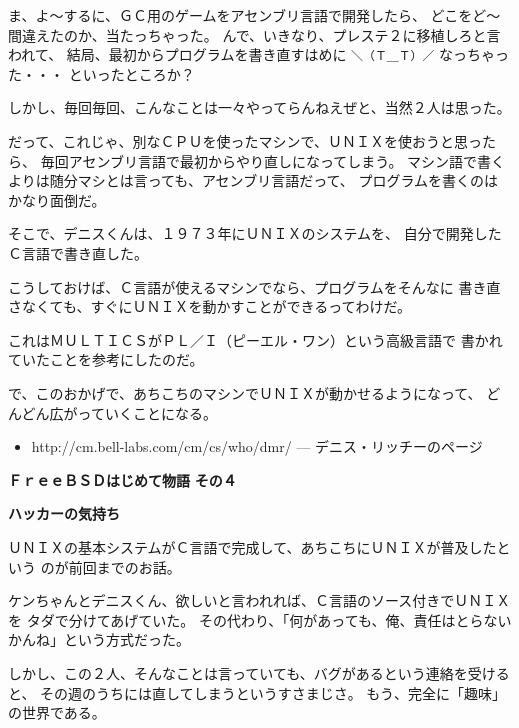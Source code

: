 \documentclass[12pt]{jarticle}
\begin{document}
\bigskip

ま、よ〜するに、ＧＣ用のゲームをアセンブリ言語で開発したら、
どこをど〜間違えたのか、当たっちゃった。
んで、いきなり、プレステ２に移植しろと言われて、
結局、最初からプログラムを書き直すはめに \verb+＼（Ｔ＿Ｔ）／+ なっちゃった・・・
といったところか？

\bigskip

しかし、毎回毎回、こんなことは一々やってらんねえぜと、当然２人は思った。

だって、これじゃ、別なＣＰＵを使ったマシンで、ＵＮＩＸを使おうと思ったら、
毎回アセンブリ言語で最初からやり直しになってしまう。
マシン語で書くよりは随分マシとは言っても、アセンブリ言語だって、
プログラムを書くのはかなり面倒だ。

\bigskip

そこで、デニスくんは、１９７３年にＵＮＩＸのシステムを、
自分で開発したＣ言語で書き直した。

こうしておけば、Ｃ言語が使えるマシンでなら、プログラムをそんなに
書き直さなくても、すぐにＵＮＩＸを動かすことができるってわけだ。

これはＭＵＬＴＩＣＳがＰＬ／Ｉ（ピーエル・ワン）という高級言語で
書かれていたことを参考にしたのだ。

\bigskip

で、このおかげで、あちこちのマシンでＵＮＩＸが動かせるようになって、
どんどん広がっていくことになる。

\begin{itemize}
\item http://cm.bell-labs.com/cm/cs/who/dmr/ --- デニス・リッチーのページ
\end{itemize}
\newpage

\noindent
\textbf{\Huge ＦｒｅｅＢＳＤはじめて物語}
\hspace{1cm}
\textbf{\LARGE その４}

\bigskip

\textbf{\large ハッカーの気持ち}

\bigskip
\bigskip

ＵＮＩＸの基本システムがＣ言語で完成して、あちこちにＵＮＩＸが普及したという
のが前回までのお話。

\bigskip

ケンちゃんとデニスくん、欲しいと言われれば、Ｃ言語のソース付きでＵＮＩＸを
タダで分けてあげていた。
その代わり、「何があっても、俺、責任はとらないかんね」という方式だった。

しかし、この２人、そんなことは言っていても、バグがあるという連絡を受けると、
その週のうちには直してしまうというすさまじさ。
もう、完全に「趣味」の世界である。
\end{document}

